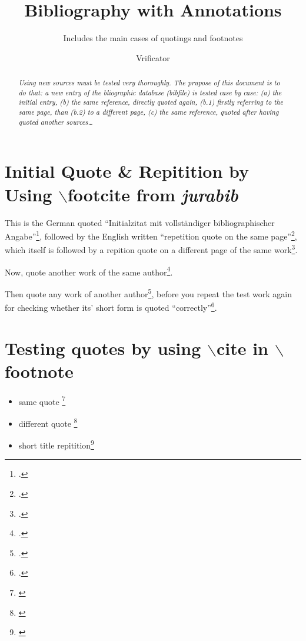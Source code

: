 \documentclass[
  DIV=calc,
  BCOR=5mm,
  11pt,
  headings=small,
  oneside,
  abstract=true,
  toc=bib,
  ngerman,english]{scrartcl}
\begin{document}

\titlehead{Testing the Bibliography}
\subject{For evaluating \itshape{new bibliographic data}}
\title{Bibliography with Annotations}
\subtitle{Includes the main cases of quotings and footnotes}
\author{Vrificator}

\maketitle



\begin{abstract}
\noindent \itshape
Using new sources must be tested very thoroughly. The prupose of this document
is to do that: a new entry of the bliographic database (bibfile) is tested case
by case: (a) the initial entry, (b) the same reference, directly quoted again,
(b.1) firstly referring to the same page, than (b.2) to a different page, (c)
the same reference, quoted after having quoted another sources\ldots
\end{abstract}
\footnotesize
\normalsize

\section{Initial Quote \& Repitition by Using $\backslash$footcite from
\emph{jurabib}}

This is the German quoted \foreignquote{german}{Initialzitat mit
vollständiger bibliographischer Angabe}\footcite[cf.][123pp]{Allen2001a}, followed by
the English written \foreignquote{english}{repetition quote on the same
page}\footcite[cf.][123ff]{Allen2001a}, which itself is followed by a
repition quote on a different page of the same
work\footcite[cf.][125p]{Allen2001a}.

Now, quote another work of the same author\footcite[cf.][321]{Allen2001a}.

Then quote any work of another author\footcite[cf.][42]{ModLanAss2009a}, before you
repeat the test work again for checking whether its' short form is quoted
\enquote{correctly}\footcite[cf.][123]{Allen2001a}.

\section{Testing quotes by using $\backslash$cite in $\backslash$footnote}

\begin{itemize}
  \item same quote \footnote{\cite[cf.][125]{Allen2001a}}
  \item different quote \footnote{\cite[cf.][42]{ModLanAss2009a}}
  \item short title repitition\footnote{\cite[cf.][125]{Allen2001a}}
\end{itemize}


\end{document}
